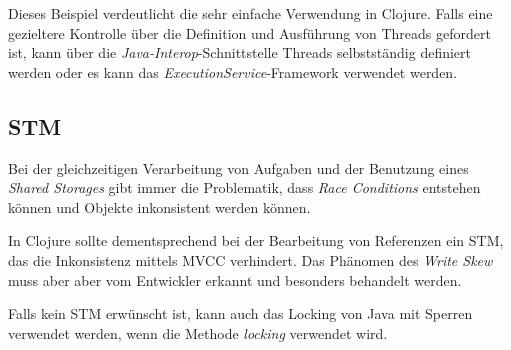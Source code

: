 Dieses Beispiel verdeutlicht die sehr einfache Verwendung in Clojure. Falls eine gezieltere Kontrolle über die Definition und Ausführung von Threads gefordert ist, kann über die \textit{Java-Interop}-Schnittstelle Threads selbstständig definiert werden oder es kann das \textit{ExecutionService}-Framework verwendet werden.

\subsection*{\acl{STM}}
Bei der gleichzeitigen Verarbeitung von Aufgaben und der Benutzung eines \textit{Shared Storages} gibt immer die Problematik, dass \textit{Race Conditions} entstehen können und Objekte inkonsistent werden können.

In Clojure sollte dementsprechend bei der Bearbeitung von Referenzen ein \acf{STM}, das die Inkonsistenz mittels \ac{MVCC} verhindert. Das Phänomen des \textit{Write Skew} muss aber aber vom Entwickler erkannt und besonders behandelt werden.

Falls kein \ac{STM} erwünscht ist, kann auch das Locking von Java mit Sperren verwendet werden, wenn die Methode \textit{locking} verwendet wird.
